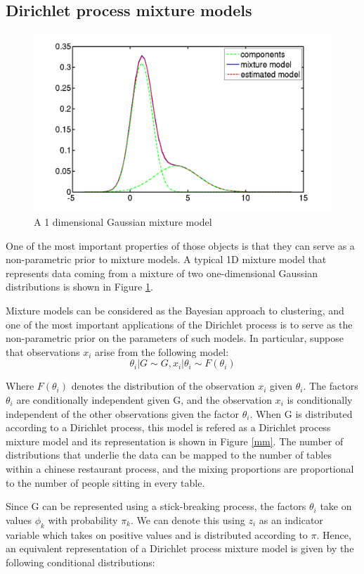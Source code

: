 \documentclass [twoside,hidelinks]{article}
\begin{document}
\subsection{Dirichlet process mixture models}

\begin{figure} [!ht]
    \centerline{\includegraphics [width=.45\textwidth]{1DGMM}}
	\caption{A 1 dimensional Gaussian mixture model}
	\label{1dGMM}
\end{figure}

One of the most important properties of those objects is that they can serve as a non-parametric prior to mixture models. A typical 1D mixture model that represents data coming from a mixture of two one-dimensional Gaussian distributions is shown in Figure \ref{1dGMM}.

Mixture models can be considered as the Bayesian approach to clustering, and one of the most important applications of the Dirichlet process is to serve as the non-parametric prior on the parameters of such models. In particular, suppose that observations $x_i$ arise from the following model:
	\begin{equation}
			\theta_i | G \sim G ,
			x_i | \theta_i \sim F (\theta_i )
	\end{equation}

Where $F (\theta_i )$ denotes the distribution of the observation $x_i$ given $\theta_i $. The factors $ \theta_i $ are conditionally independent given G, and the observation $x_i$ is conditionally independent of the other observations given the factor $\theta_i$. When G is distributed according to a Dirichlet process, this model is refered as a Dirichlet process mixture model and its representation is shown in Figure \ref{mm}. The number of distributions that underlie the data can be mapped to the number of tables within a chinese restaurant process, and the mixing proportions are proportional to the number of people sitting in every table.

Since G can be represented using a stick-breaking process, the factors $ \theta_i $ take on values $\phi_k$ with probability $\pi_k$. We can denote this using $z_i$ as an indicator variable which takes on positive values and is distributed according to \textbf{$\pi$}. Hence, an equivalent representation of a Dirichlet process mixture model  is given by the following conditional distributions:
\end{document}
